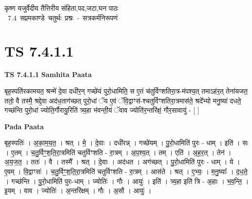 \documentclass[17pt]{extarticle}
\begin{document}
\begin{titlepage}
    \begin{center}
 
\begin{sanskrit}
    { \Large
    कृष्ण यजुर्वेदीय तैत्तिरीय संहिता,पद,जटा,घन पाठः 
    }
    \\
    \vspace{2.5cm}
    \mbox{ \Large
    7.4      सप्तमकाण्डे चतुर्थः प्रश्नः - सत्रकर्मनिरूपणं   }
\end{sanskrit}
\end{center}

\end{titlepage}
\tableofcontents
{}
\pagebreak


\section{ TS 7.4.1.1 }

\textbf{TS 7.4.1.1 } \newline
\textbf{Samhita Paata} \newline

बृह॒स्पति॑रकामयत॒ श्रन्मे॑ दे॒वा दधी॑र॒न् गच्छे॑यं पुरो॒धामिति॒ स ए॒तं च॑तुर्विꣳशतिरा॒त्र-म॑पश्य॒त् तमाऽह॑र॒त् तेना॑यजत॒ ततो॒ वै तस्मै॒ श्रद्दे॒वा अद॑ध॒ताग॑च्छत् पुरो॒धां ॅय ए॒वं ॅवि॒द्वाꣳस॑-श्चतुर्विꣳशतिरा॒त्रमास॑ते॒ श्रदे᳚भ्यो मनु॒ष्या॑ दधते॒ गच्छ॑न्ति पुरो॒धां ज्योति॒र्गौरायु॒रिति॑ त्र्य॒हा भ॑वन्ती॒यं ॅवाव ज्योति॑र॒न्तरि॑क्षं॒ गौर॒सावायु॑ - [  ] \newline

\textbf{Pada Paata} \newline

बृह॒स्पतिः॑ । अ॒का॒म॒य॒त॒ । श्रत् । मे॒ । दे॒वाः । दधी॑रन्न् । गच्छे॑यम् । पु॒रो॒धामिति॑ पुरः - धाम् । इति॑ । सः । ए॒तम् । च॒तु॒र्विꣳ॒॒श॒ति॒रा॒त्रमिति॑ चतुर्विꣳशति - रा॒त्रम् । अ॒प॒श्य॒त् । तम् । एति॑ । अ॒ह॒र॒त् । तेन॑ । अ॒य॒ज॒त॒ । ततः॑ । वै । तस्मै᳚ । श्रत् । दे॒वाः । अद॑धत । अग॑च्छत् । पु॒रो॒धामिति॑ पुरः - धाम् । ये । ए॒वम् । वि॒द्वाꣳसः॑ । च॒तु॒र्विꣳ॒॒श॒ति॒रा॒त्रमिति॑ चतुर्विꣳशति - रा॒त्रम् । आस॑ते । श्रत् । ए॒भ्यः॒ । म॒नु॒ष्याः᳚ । द॒ध॒ते॒ । गच्छ॑न्ति । पु॒रो॒धामिति॑ पुरः-धाम् । ज्योतिः॑ । गौः । आयुः॑ । इति॑ । त्र्य॒हा इति॑ त्रि - अ॒हाः । भ॒व॒न्ति॒ । इ॒यम् । वाव । ज्योतिः॑ । अ॒न्तरि॑क्षम् । गौः । अ॒सौ । आयुः॑ ।  \newline




\end{document}

